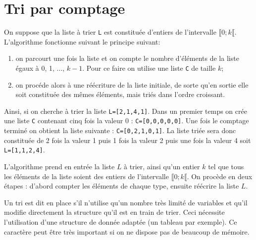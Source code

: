 
\section*{Tri par comptage}
On suppose que la liste à trier \lstinline{L} est constituée d’entiers de l’intervalle  $\llbracket 0; k \llbracket$. L’algorithme
fonctionne suivant le principe suivant: 
\begin{enumerate}
\item on parcourt une fois la liste et on compte le nombre d’éléments de
la liste égaux à 0, 1, ..., $k-1$. Pour ce faire on utilise une liste \lstinline{C} de taille $k$;
\item on procéde alors à une réécriture de la liste initiale, de sorte qu’en sortie elle soit constituée des mêmes éléments, mais triés dans l’ordre
croissant.
\end{enumerate}

Ainsi, si on cherche à trier la liste \lstinline{L=[2,1,4,1]}. Dans un premier temps on crée une liste \lstinline{C} contenant cinq fois la valeur 0 : \lstinline{C=[0,0,0,0,0]}. Une fois le comptage terminé on obtient la liste suivante : \lstinline{C=[0,2,1,0,1]}. La liste triée sera donc constituée de 2 fois la valeur 1 puis 1 fois la valeur 2 puis une fois la valeur 4 soit \lstinline{L=[1,1,2,4]}.



L’algorithme prend en entrée la liste $L$ à trier, ainsi qu’un entier $k$ tel que tous les éléments de la
liste soient des entiers de l’intervalle $\llbracket 0; k \llbracket$. On procède en deux étapes : d’abord compter les éléments de chaque type,
ensuite réécrire la liste $L$.



\begin{defi}
Un tri est dit en place s'il n'utilise qu'un nombre très limité de variables et qu’il modifie directement la structure qu’il est en train de trier. Ceci nécessite l’utilisation d'une structure de donnée adaptée (un tableau par exemple). Ce caractère peut être très important si on ne dispose pas de beaucoup de mémoire.
\end{defi}

